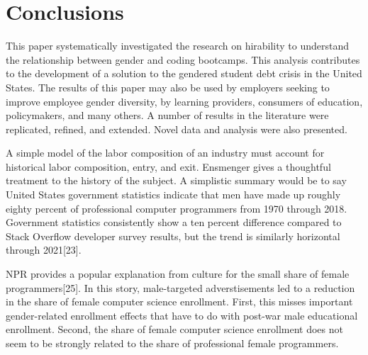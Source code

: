\documentclass[review]{elsarticle}
\begin{document}

\section{Conclusions}

This paper systematically investigated the research on hirability to understand the relationship between gender and coding bootcamps.
This analysis contributes to the development of a solution to the gendered student debt crisis in the United States.
The results of this paper may also be used by employers seeking to improve employee gender diversity,
by learning providers,
consumers of education,
policymakers,
and many others.
A number of results in the literature were replicated, refined, and extended.
Novel data and analysis were also presented.

A simple model of the labor composition of an industry must account for historical labor composition,
entry, and exit.
Ensmenger gives a thoughtful treatment to the history of the subject\cite{ensmenger2010making}.
A simplistic summary would be to say United States government statistics indicate that men
have made up roughly eighty percent of professional computer programmers from 1970 through 2018.
Government statistics consistently show a ten percent difference compared to Stack Overflow developer survey results,
but the trend is similarly horizontal through 2021[23].

NPR provides a popular explanation from culture for the small share of female programmers[25].
In this story, male-targeted adverstisements led to a reduction in the share of female computer science enrollment.
First, this misses important gender-related enrollment effects that have to do with post-war male educational enrollment.
Second, the share of female computer science enrollment does not seem to be strongly related to the share of professional female programmers.
\end{document}
